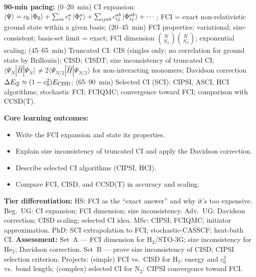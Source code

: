 \documentclass[11pt,a4paper]{article}
\begin{document}
\begin{tcolorbox}[chembox, title={Module~III.2 --- Lecture L09: Configuration Interaction and the Exact Non-Relativistic Limit}]
\textbf{90-min pacing:} (0--20~min) CI expansion: $\ket{\Psi}=c_0\ket{\Phi_0}+\sum_{ia}c_i^a\ket{\Phi_i^a}+\sum_{ijab}c_{ij}^{ab}\ket{\Phi_{ij}^{ab}}+\cdots$; FCI = exact non-relativistic ground state within a given basis; (20--45~min) FCI properties: variational; size-consistent; basis-set limit = exact; FCI dimension $\binom{K}{N_\alpha}\binom{K}{N_\beta}$; exponential scaling; (45--65~min) Truncated CI: CIS (singles only; no correlation for ground state by Brillouin); CISD; CISDT; size inconsistency of truncated CI; $\langle\Psi_{N}|\hat{H}|\Psi_{N}\rangle \neq 2\langle\Psi_{N/2}|\hat{H}|\Psi_{N/2}\rangle$ for non-interacting monomers; Davidson correction $\Delta E_Q\approx(1-c_0^2)E_{\rm CISD}$; (65--90~min) Selected CI (SCI): CIPSI, ASCI, HCI algorithms; stochastic FCI; FCIQMC; convergence toward FCI; comparison with CCSD(T).

\medskip\textbf{Core learning outcomes:}
\begin{itemize}[leftmargin=1.4em,topsep=2pt,itemsep=1pt]
  \item Write the FCI expansion and state its properties.
  \item Explain size inconsistency of truncated CI and apply the Davidson correction.
  \item Describe selected CI algorithms (CIPSI, HCI).
  \item Compare FCI, CISD, and CCSD(T) in accuracy and scaling.
\end{itemize}
\medskip\textbf{Tier differentiation:}
HS: FCI as the ``exact answer'' and why it's too expensive.
Beg.\ UG: CI expansion; FCI dimension; size inconsistency.
Adv.\ UG: Davidson correction; CISD scaling; selected CI idea.
MSc: CIPSI; FCIQMC; initiator approximation.
PhD: SCI extrapolation to FCI; stochastic-CASSCF; heat-bath CI.
\medskip\textbf{Assessment:}
Set~A --- FCI dimension for H$_2$/STO-3G; size inconsistency for He$_2$; Davidson correction.
Set~B --- prove size inconsistency of CISD; CIPSI selection criterion.
Projects: (simple) FCI vs.\ CISD for H$_2$: energy and $c_0^2$ vs.\ bond length; (complex) selected CI for N$_2$: CIPSI convergence toward FCI.
\end{tcolorbox}

\medskip
\end{document}
